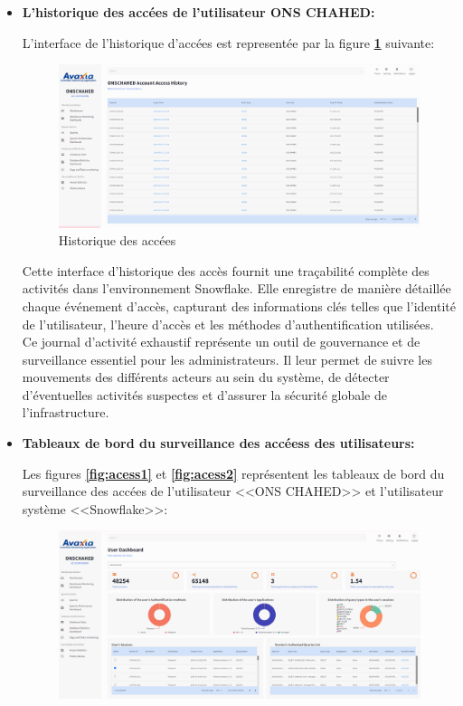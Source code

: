 \begin{itemize}
        \item \textbf{L'historique des accées de l'utilisateur ONS CHAHED:}
        \par L'interface de l'historique d'accées est representée par la figure \textbf{\ref{fig:accesslist}} suivante:
        \begin{figure}[H]
            \centering
            \includegraphics[width =1\linewidth]{img/captures/user/history.png}
            \caption{Historique des accées}
                \label{fig:accesslist}
            \end{figure}
            \par Cette interface d'historique des accès fournit une traçabilité complète des activités dans l'environnement Snowflake. 
            Elle enregistre de manière détaillée chaque événement d'accès, capturant des informations clés telles que l'identité de l'utilisateur, l'heure d'accès et les méthodes d'authentification utilisées. \\
            Ce journal d'activité exhaustif représente un outil de gouvernance et de surveillance essentiel pour les administrateurs. 
            Il leur permet de suivre les mouvements des différents acteurs au sein du système, de détecter d'éventuelles activités suspectes et d'assurer la sécurité globale de l'infrastructure.
            \item \textbf{Tableaux de bord du surveillance des accéess des utilisateurs:}
             \par Les figures \textbf{\ref{fig:acess1}} et \textbf{\ref{fig:acess2}} représentent les tableaux de bord du surveillance des accées de l'utilisateur <<ONS CHAHED>> et l'utilisateur système <<Snowflake>>:
             \begin{figure}[H]
                \centering
                \includegraphics[width =1\linewidth]{img/captures/user/1.png}

\end{figure}
\end{itemize}
